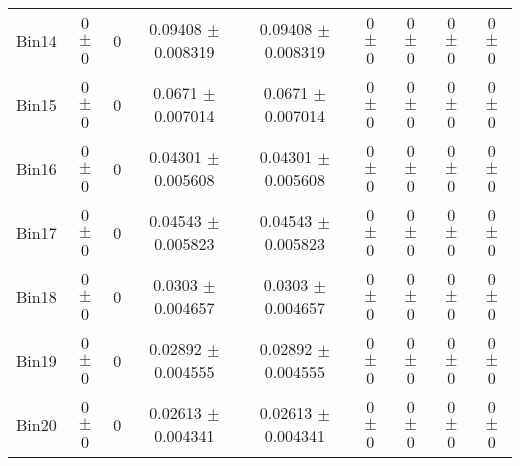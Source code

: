 \begin{tabular}{@{\extracolsep{4pt}}lcccccccc@{}}
     Bin14 & 0 $\pm$ 0 & 0 & 0.09408 $\pm$ 0.008319 & 0.09408 $\pm$ 0.008319 & 0 $\pm$ 0 & 0 $\pm$ 0 & 0 $\pm$ 0 & 0 $\pm$ 0 \\ 
     Bin15 & 0 $\pm$ 0 & 0 & 0.0671 $\pm$ 0.007014 & 0.0671 $\pm$ 0.007014 & 0 $\pm$ 0 & 0 $\pm$ 0 & 0 $\pm$ 0 & 0 $\pm$ 0 \\ 
     Bin16 & 0 $\pm$ 0 & 0 & 0.04301 $\pm$ 0.005608 & 0.04301 $\pm$ 0.005608 & 0 $\pm$ 0 & 0 $\pm$ 0 & 0 $\pm$ 0 & 0 $\pm$ 0 \\ 
     Bin17 & 0 $\pm$ 0 & 0 & 0.04543 $\pm$ 0.005823 & 0.04543 $\pm$ 0.005823 & 0 $\pm$ 0 & 0 $\pm$ 0 & 0 $\pm$ 0 & 0 $\pm$ 0 \\ 
     Bin18 & 0 $\pm$ 0 & 0 & 0.0303 $\pm$ 0.004657 & 0.0303 $\pm$ 0.004657 & 0 $\pm$ 0 & 0 $\pm$ 0 & 0 $\pm$ 0 & 0 $\pm$ 0 \\ 
     Bin19 & 0 $\pm$ 0 & 0 & 0.02892 $\pm$ 0.004555 & 0.02892 $\pm$ 0.004555 & 0 $\pm$ 0 & 0 $\pm$ 0 & 0 $\pm$ 0 & 0 $\pm$ 0 \\ 
     Bin20 & 0 $\pm$ 0 & 0 & 0.02613 $\pm$ 0.004341 & 0.02613 $\pm$ 0.004341 & 0 $\pm$ 0 & 0 $\pm$ 0 & 0 $\pm$ 0 & 0 $\pm$ 0 \\ 
\hline\hline
  \end{tabular}
